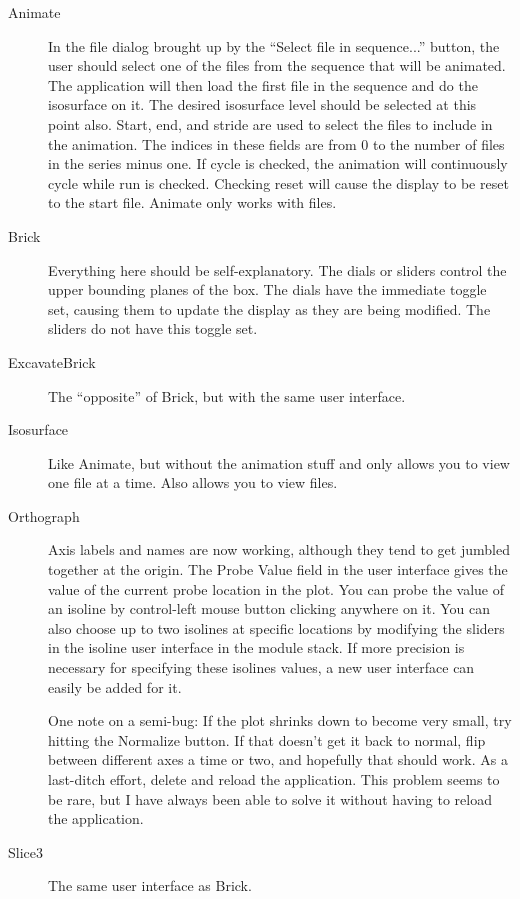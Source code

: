 \begin{description}

\item[Animate]
    In the file dialog brought up by the ``Select file in sequence...'' button,
    the user should select one of the  files from the sequence
    that will be animated.  The application will then load the first file in
    the sequence and do the isosurface on it.  The desired isosurface level
    should be selected at this point also.  Start, end, and stride are used
    to select the files to include in the animation.  The indices in these
    fields are from 0 to the number of  files in the series minus
    one.  If cycle is checked, the animation will continuously cycle while
    run is checked.  Checking reset will cause the display to be reset to the
    start file.  Animate only works with  files.

\item[Brick]
    Everything here should be self-explanatory.  The dials or sliders control
    the upper bounding planes of the box.  The dials have the immediate
    toggle set, causing them to update the display as they are being
    modified.  The sliders do not have this toggle set.

\item[ExcavateBrick]
    The ``opposite'' of Brick, but with the same user interface.
 
\item[Isosurface]
    Like Animate, but without the animation stuff and only allows you to view
    one file at a time.  Also allows you to view  files.
 
\item[Orthograph]
    Axis labels and names are now working, although they tend to get jumbled
    together at the origin.  The Probe Value field in the user interface
    gives the value of the current probe location in the plot.  You can probe
    the value of an isoline by control-left mouse button clicking anywhere on
    it.  You can also choose up to two isolines at specific locations by
    modifying the sliders in the isoline user interface in the module stack.
    If more precision is necessary for specifying these isolines values, a
    new user interface can easily be added for it.
 
    One note on a semi-bug: If the plot shrinks down to become very small,
    try hitting the Normalize button.  If that doesn't get it back to normal,
    flip between different axes a time or two, and hopefully that should
    work.  As a last-ditch effort, delete and reload the application.  This
    problem seems to be rare, but I have always been able to solve it without
    having to reload the application.

\item[Slice3]
    The same user interface as Brick.

\end{description}

